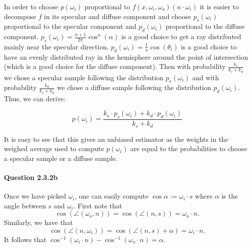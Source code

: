 \documentclass{article}
\begin{document}
In order to choose $p(\omega_i)$ proportional to $f(x, \omega_i, \omega_o)(n \cdot \omega_i)$ it is easier to decompose $f$ in its specular and diffuse component and choose $p_s(\omega_i)$ proportional to the specular component and $p_d(\omega_i)$ proportional to the diffuse component.
$p_s(\omega_i) = \frac{n+1}{2\pi}\cos^n(\alpha)$ is a good choice to get a ray distributed mainly near the specular direction. $p_d(\omega_i) = \frac{1}{\pi}\cos(\theta_i)$ is a good choice to have an evenly distributed ray in the hemisphere around the point of intersection (which is a good choice for the diffuse component). Then with probability $\frac{k_s}{k_s + k_d}$ we chose a specular sample following the distribution $p_s(\omega_i)$ and with probability $\frac{k_d}{k_s + k_d}$ we chose a diffuse sample following the distribution $p_d(\omega_i)$. Thus, we can derive:

$$p(\omega_i) = \frac{k_s \cdot p_s(\omega_i) + k_d \cdot p_d(\omega_i)}{k_s + k_d}$$

It is easy to see that this gives an unbiased estimator as the weights in the weighed average used to compute $p(\omega_i)$ are equal to the probabilities to choose a specular sample or a diffuse sample.



\paragraph{Question 2.3.2b}Once we have picked $\omega_i$, one can easily compute\linebreak 
$\cos\alpha := \omega_i \cdot s$ where $\alpha$ is the angle between $s$ and $\omega_i$. First note that $$\cos \left (\angle(\omega_o, n)\right ) = \cos \left ( \angle(n,s) \right ) = \omega_o\cdot n.$$ Similarly, we have that
$$\cos\left(\angle (n, \omega_i)\right) = \cos\left(\angle(n,s) + \alpha\right) = \omega_i \cdot n.$$
It follows that $\cos^{-1}{\left(\omega_i \cdot n\right)} - \cos^{-1}{\left(\omega_o\cdot n\right)} = \alpha.$
\end{document}
